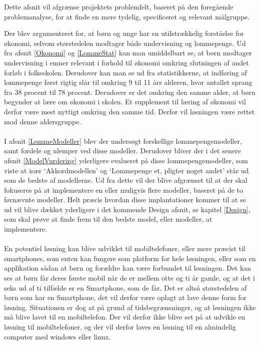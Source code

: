 Dette afsnit vil afgrænse projektets problemfelt, baseret på den foregående problemanalyse, for at finde en mere tydelig, specificeret og relevant målgruppe.

Der blev argumenteret for, at børn og unge har en utilstrækkelig forståelse for økonomi, selvom størstedelen modtager både undervisning og lommepenge. Ud fra afsnit \ref{Okonomi}  og \ref{LommeStat}  kan man umiddelbart se, at børn modtager undervisning i emner relevant i forhold til økonomi omkring slutningen af andet forløb i folkeskolen. Derudover kan man se ud fra statistikkerne, at indføring af lommepenge først rigtig slår til omkring 9 til 11 års alderen, hvor antallet sprang fra 38 procent til 78 procent. Derudover er det omkring den samme alder, at børn begynder at lære om økonomi i skolen. Et supplement til læring af økonomi vil derfor være mest nyttigt omkring den samme tid. Derfor vil løsningen være rettet mod denne aldersgruppe.\\
\\
I afsnit \ref{LommeModeller} blev der undersøgt forskellige lommepengemodeller, samt fordele og ulemper ved disse modeller. Derudover bliver der i det senere afsnit \ref{ModelVurdering} yderligere evalueret på disse lommepengemodeller, som viste at især ‘Akkordmodellen’ og ‘Lommepenge et, pligter noget andet’ står ud som de bedste af modellerne. Ud fra dette vil der blive afgrænset til at der skal fokuseres på at implementere en eller muligvis flere modeller, baseret på de to førnævnte modeller. Helt præcis hvordan disse implantationer kommer til at se ud vil blive dækket yderligere i det kommende Design afsnit, se kapitel \ref{Design}, som skal prøve at finde frem til den bedste model, eller modeller, at implementere. \\
\\
En potentiel løsning kan blive udviklet til mobiltelefoner, eller mere præcist til smartphones, som enten kan fungere som platform for hele løsningen, eller som en applikation sådan at børn og forældre kan være forbundet til løsningen. Det kan ses at børn får deres første mobil når de er mellem otte og ti år gamle, og at det i seks ud af ti tilfælde er en Smartphone, som de får\cite{BornSmart}. Det er altså størstedelen af børn som har en Smartphone, det vil derfor være oplagt at lave denne form for løsning. Situationen er dog at på grund af tidsbegrænsninger, og at løsningen ikke må blive lavet til en mobiltelefon. Der vil derfor ikke blive set på at udvikle en løsning til mobiltelefoner, og der vil derfor laves en løsning til en almindelig computer med windows eller linux.\\
